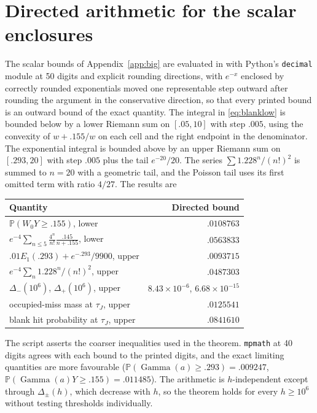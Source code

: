 \documentclass[11pt,a4paper]{article}
\theoremstyle{plain}
\theoremstyle{definition}
\theoremstyle{remark}
\newcommand{\Prob}{\mathbb P}
\newcommand{\Gam}{\operatorname{Gamma}}
\begin{document}
\section{Directed arithmetic for the scalar enclosures}\label{app:arith}
The scalar bounds of Appendix~\ref{app:big} are evaluated in  with Python's \texttt{decimal} module at 50 digits and explicit rounding directions, with $e^{-x}$ enclosed by correctly rounded exponentials moved one representable step outward after rounding the argument in the conservative direction, so that every printed bound is an outward bound of the exact quantity. The integral in \eqref{eq:blanklow} is bounded below by a lower Riemann sum on $[.05,10]$ with step $.005$, using the convexity of $w+.155/w$ on each cell and the right endpoint in the denominator. The exponential integral is bounded above by an upper Riemann sum on $[.293,20]$ with step $.005$ plus the tail $e^{-20}/20$. The series $\sum1.228^n/(n!)^2$ is summed to $n=20$ with a geometric tail, and the Poisson tail uses its first omitted term with ratio $4/27$. The results are
\begin{center}\small
\begin{tabular}{lr}\toprule
Quantity & Directed bound\\\midrule
$\Prob(W_0Y\ge.155)$, lower & $.0108763$\\
$e^{-4}\sum_{n\le5}\frac{4^n}{n!}\frac{.145}{n+.155}$, lower & $.0563833$\\
$.01E_1(.293)+e^{-.293}/9900$, upper & $.0093715$\\
$e^{-4}\sum_n1.228^n/(n!)^2$, upper & $.0487303$\\
$\Delta_-(10^{6})$, $\Delta_+(10^{6})$, upper & $8.43\times10^{-6}$, $6.68\times10^{-15}$\\
occupied-miss mass at $\tau_J$, upper & $.0125541$\\
blank hit probability at $\tau_J$, upper & $.0841610$\\\bottomrule
\end{tabular}
\end{center}
The script asserts the coarser inequalities used in the theorem. \texttt{mpmath} at 40 digits agrees with each bound to the printed digits, and the exact limiting quantities are more favourable ($\Prob(\Gam(a)\ge.293)=.009247$, $\Prob(\Gam(a)Y\ge.155)=.011485$). The arithmetic is $h$-independent except through $\Delta_\pm(h)$, which decrease with $h$, so the theorem holds for every $h\ge10^{6}$ without testing thresholds individually.
\end{document}
